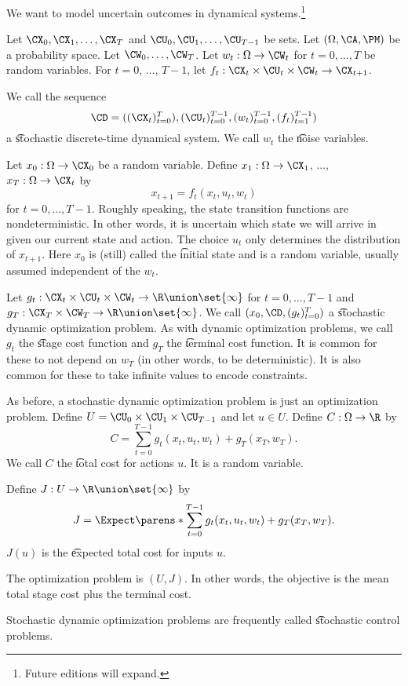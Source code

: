 

We want to model uncertain outcomes in dynamical systems.\footnote{Future editions will expand.}


Let $\CX_0, \CX_1, \dots, \CX_{T}$ and $\CU_0, \CU_1, \dots, \CU_{T-1}$ be sets.
Let $(\Omega, \CA, \PM)$ be a probability space.
Let $\CW_{0}, \dots, \CW_{T}$.
Let $w_{t}: \Omega \to \CW_{t}$ for $t = 0, \dots, T$ be random variables.
For $t = 0$, $\dots$, $T-1$, let $f_{t}: \CX_t \times \CU_t \times \CW_t \to \CX_{t+1}$.

We call the sequence
\[
	\CD = ((\CX_t)_{t = 0}^{T}), (\CU_t)_{t=0}^{T-1}, (w_t)_{t=0}^{T-1}, (f_t)_{t=1}^{T-1})
\]
a \t{stochastic discrete-time dynamical system}.
We call $w_t$ the \t{noise} variables.



Let $x_0: \Omega \to \CX_0$ be a random variable.
Define $x_1: \Omega \to \CX_1$, $\dots$, $x_T: \Omega \to \CX_t$ by
\[
    x_{t+1} = f_t(x_t, u_t, w_t)
\]
for $t = 0, \dots, T-1$.
Roughly speaking, the state transition functions are nondeterministic.
In other words, it is uncertain which state we will arrive in given our current state and action.
The choice $u_t$ only determines the distribution of $x_{t+1}$.
Here $x_0$ is (still) called the \t{initial state} and is a random variable, usually assumed independent of the $w_t$.

Let $g_t: \CX_t \times \CU_t \times \CW_t \to \R \union \set{\infty}$ for $t =0, \dots, T-1$ and $g_{T}: \CX_T \times \CW_T \to \R \union \set{\infty}$.
We call $(x_0, \CD, (g_t)_{t = 0}^{T})$ a \t{stochastic dynamic optimization problem}.
As with dynamic optimization problems, we call $g_t$ the \t{stage cost function} and $g_T$ the \t{terminal cost function}.
It is common for these to not depend on $w_T$ (in other words, to be deterministic).
It is also common for these to take infinite values to encode constraints.

As before, a stochastic dynamic optimization problem is just an optimization problem.
Define $U = \CU_0 \times \CU_1 \times \CU_{T-1}$ and let $u \in U$.
Define $C: \Omega \to \R$ by
\[
  C = \sum_{t = 0}^{T-1} g_t(x_t, u_t, w_t) + g_T(x_T, w_T).
\]
We call $C$ the \t{total cost} for actions $u$.
It is a random variable.

Define $J: U \to \R \union \set{\infty}$ by
\[
    J = \Expect \parens*{
          \sum_{t = 0}^{T-1} g_t(x_t, u_t, w_t) + g_T(x_T, w_T)
    }.
\]
$J(u)$ is the \t{expected total cost} for inputs $u$.

The optimization problem is $(U, J)$.
In other words, the objective is the mean total stage cost plus the terminal cost.


Stochastic dynamic optimization problems are frequently called \t{stochastic control problems}.

